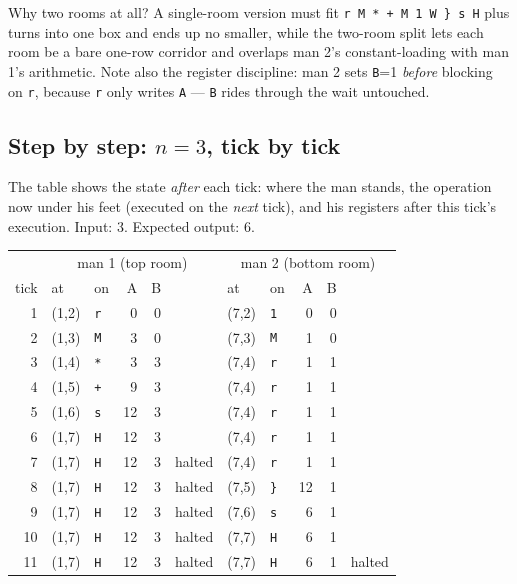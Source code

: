 \documentclass[11pt,a4paper]{article}
\newcommand{\op}[1]{\texttt{#1}}
\begin{document}
Why two rooms at all? A single-room version must fit
\op{r\,M\,*\,+\,M\,1\,W\,\}\,s\,H} plus turns into one box and ends up no
smaller, while the two-room split lets each room be a bare one-row corridor
and overlaps man 2's constant-loading with man 1's arithmetic. Note also the
register discipline: man 2 sets \op{B}=1 \emph{before} blocking on \op{r},
because \op{r} only writes \op{A} --- \op{B} rides through the wait
untouched.

\subsection{Step by step: $n=3$, tick by tick}

The table shows the state \emph{after} each tick: where the man stands, the
operation now under his feet (executed on the \emph{next} tick), and his
registers after this tick's execution. Input: 3. Expected output: 6.

\begin{center}
\small
\begin{tabular}{r|llrrl|llrrl}
\multicolumn{1}{c}{} & \multicolumn{5}{c}{man 1 (top room)} & \multicolumn{5}{c}{man 2 (bottom room)}\\
tick & at & on & A & B & & at & on & A & B & \\ \hline
1 & (1,2) & \texttt{r} & 0 & 0 &  & (7,2) & \texttt{1} & 0 & 0 & \\
2 & (1,3) & \texttt{M} & 3 & 0 &  & (7,3) & \texttt{M} & 1 & 0 & \\
3 & (1,4) & \texttt{*} & 3 & 3 &  & (7,4) & \texttt{r} & 1 & 1 & \\
4 & (1,5) & \texttt{+} & 9 & 3 &  & (7,4) & \texttt{r} & 1 & 1 & \\
5 & (1,6) & \texttt{s} & 12 & 3 &  & (7,4) & \texttt{r} & 1 & 1 & \\
6 & (1,7) & \texttt{H} & 12 & 3 &  & (7,4) & \texttt{r} & 1 & 1 & \\
7 & (1,7) & \texttt{H} & 12 & 3 & halted & (7,4) & \texttt{r} & 1 & 1 & \\
8 & (1,7) & \texttt{H} & 12 & 3 & halted & (7,5) & \texttt{\}} & 12 & 1 & \\
9 & (1,7) & \texttt{H} & 12 & 3 & halted & (7,6) & \texttt{s} & 6 & 1 & \\
10 & (1,7) & \texttt{H} & 12 & 3 & halted & (7,7) & \texttt{H} & 6 & 1 & \\
11 & (1,7) & \texttt{H} & 12 & 3 & halted & (7,7) & \texttt{H} & 6 & 1 & halted\\
\end{tabular}
\end{center}
\end{document}
